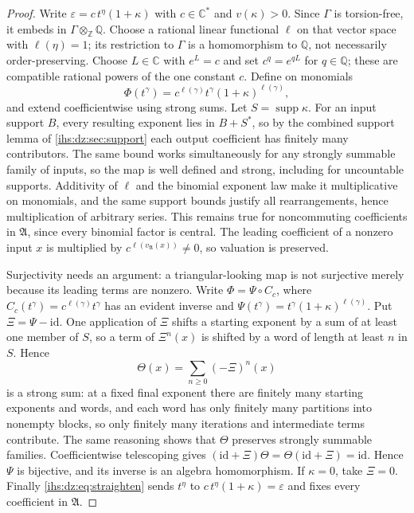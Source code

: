\documentclass[11pt,a4paper]{article}
\numberwithin{equation}{section}
\theoremstyle{definition}
\theoremstyle{remark}
\newcommand{\C}{\mathbb C}
\newcommand{\Q}{\mathbb Q}
\newcommand{\Z}{\mathbb Z}
\newcommand{\supp}{\operatorname{supp}}
\newcommand{\eps}{\varepsilon}
\newcommand{\Alg}{\mathfrak A}
\begin{document}
\begin{proof}
Write $\eps=c\,t^\eta(1+\kappa)$ with $c\in\C^*$ and $v(\kappa)>0$. Since
$\Gamma$ is torsion-free, it embeds in $\Gamma\otimes_\Z\Q$. Choose a
rational linear functional $\ell$ on that vector space with $\ell(\eta)=1$;
its restriction to $\Gamma$ is a homomorphism to $\Q$, not necessarily
order-preserving. Choose $L\in\C$ with $e^L=c$ and set $c^q=e^{qL}$ for
$q\in\Q$; these are compatible rational powers of the one constant $c$.
Define on monomials
\begin{equation}\label{ihs:dz:eq:straighten}
 \Phi(t^\gamma)=c^{\ell(\gamma)}t^\gamma(1+\kappa)^{\ell(\gamma)},
\end{equation}
and extend coefficientwise using strong sums. Let $S=\supp\kappa$. For an
input support $B$, every resulting exponent lies in $B+S^*$, so by the
combined support lemma of \cref{ihs:dz:sec:support} each output coefficient
has finitely many contributors. The same bound works simultaneously for any
strongly summable family of inputs, so the map is well defined and strong,
including for uncountable supports. Additivity of $\ell$ and the binomial
exponent law make it multiplicative on monomials, and the same support bounds
justify all rearrangements, hence multiplication of arbitrary series. This
remains true for noncommuting coefficients in $\Alg$, since every binomial
factor is central. The leading coefficient of a nonzero input $x$ is
multiplied by $c^{\ell(v_\Alg(x))}\ne0$, so valuation is preserved.

Surjectivity needs an argument: a triangular-looking map is not surjective
merely because its leading terms are nonzero. Write $\Phi=\Psi\circ C_c$,
where $C_c(t^\gamma)=c^{\ell(\gamma)}t^\gamma$ has an evident inverse and
$\Psi(t^\gamma)=t^\gamma(1+\kappa)^{\ell(\gamma)}$. Put $\Xi=\Psi-\mathrm{id}$.
One application of $\Xi$ shifts a starting exponent by a sum of at least one
member of $S$, so a term of $\Xi^n(x)$ is shifted by a word of length at
least $n$ in $S$. Hence
\begin{equation}\label{ihs:dz:eq:operatorinverse}
 \Theta(x)=\sum_{n\ge0}(-\Xi)^n(x)
\end{equation}
is a strong sum: at a fixed final exponent there are finitely many starting
exponents and words, and each word has only finitely many partitions into
nonempty blocks, so only finitely many iterations and intermediate terms
contribute. The same reasoning shows that $\Theta$ preserves strongly
summable families. Coefficientwise telescoping gives
$(\mathrm{id}+\Xi)\Theta=\Theta(\mathrm{id}+\Xi)=\mathrm{id}$. Hence $\Psi$ is
bijective, and its inverse is an algebra homomorphism. If $\kappa=0$, take
$\Xi=0$. Finally \eqref{ihs:dz:eq:straighten} sends $t^\eta$ to
$c\,t^\eta(1+\kappa)=\eps$ and fixes every coefficient in $\Alg$.
\end{proof}
\end{document}
